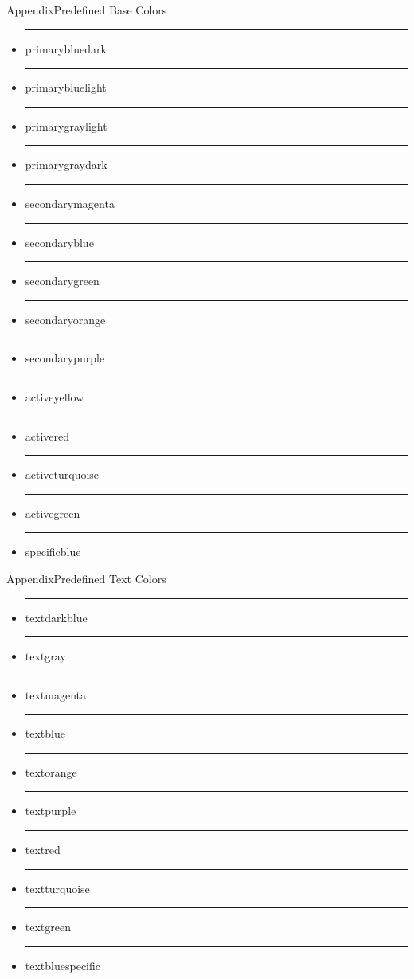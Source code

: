 \documentclass{beamer}
\begin{document}
\begin{frame}{Appendix}{Predefined Base Colors}
	\begin{itemize}
		\item {\color{primarybluedark}\rule{.7cm}{.4cm} primarybluedark}
		\item {\color{primarybluelight}\rule{.7cm}{.4cm} primarybluelight}
		\item {\color{primarygraylight}\rule{.7cm}{.4cm} primarygraylight}
		\item {\color{primarygraydark}\rule{.7cm}{.4cm} primarygraydark}
		\item {\color{secondarymagenta}\rule{.7cm}{.4cm} secondarymagenta}
		\item {\color{secondaryblue}\rule{.7cm}{.4cm} secondaryblue}
		\item {\color{secondarygreen}\rule{.7cm}{.4cm} secondarygreen}
		\item {\color{secondaryorange}\rule{.7cm}{.4cm} secondaryorange}
		\item {\color{secondarypurple}\rule{.7cm}{.4cm} secondarypurple}
		\item {\color{activeyellow}\rule{.7cm}{.4cm} activeyellow}
		\item {\color{activered}\rule{.7cm}{.4cm} activered}
		\item {\color{activeturquoise}\rule{.7cm}{.4cm} activeturquoise}
		\item {\color{activegreen}\rule{.7cm}{.4cm} activegreen}
		\item {\color{specificblue}\rule{.7cm}{.4cm} specificblue}
	\end{itemize}
\end{frame}

\begin{frame}{Appendix}{Predefined Text Colors}
	\begin{itemize}
		\item {\color{textbluedark}\rule{.7cm}{.4cm} textdarkblue}
		\item {\color{textgray}\rule{.7cm}{.4cm} textgray}
		\item {\color{textmagenta}\rule{.7cm}{.4cm} textmagenta}
		\item {\color{textblue}\rule{.7cm}{.4cm} textblue}
		\item {\color{textorange}\rule{.7cm}{.4cm} textorange}
		\item {\color{textpurple}\rule{.7cm}{.4cm} textpurple}
		\item {\color{textred}\rule{.7cm}{.4cm} textred}
		\item {\color{textturquoise}\rule{.7cm}{.4cm} textturquoise}
		\item {\color{textgreen}\rule{.7cm}{.4cm} textgreen}
		\item {\color{textbluespecific}\rule{.7cm}{.4cm} textbluespecific}
	\end{itemize}
\end{frame}
\end{document}
